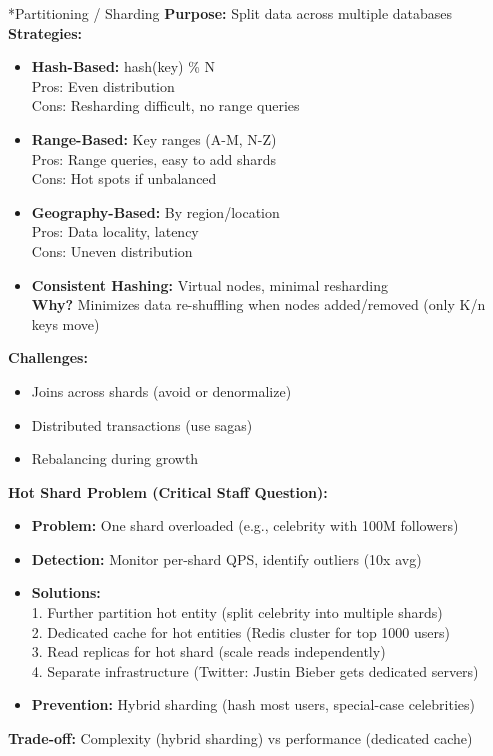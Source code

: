 \documentclass[8pt,landscape]{extarticle}
\makeatletter
\renewcommand{\subsection}{\@startsection{subsection}{2}{0pt}{3pt}{1pt}{\normalfont\normalsize\bfseries}}
\makeatother
\begin{document}
\begin{multicols*}{3}
\subsection*{Partitioning / Sharding}
\textbf{Purpose:} Split data across multiple databases \\
\textbf{Strategies:}
\begin{itemize}
\item \textbf{Hash-Based:} hash(key) \% N
  \\ Pros: Even distribution
  \\ Cons: Resharding difficult, no range queries
\item \textbf{Range-Based:} Key ranges (A-M, N-Z)
  \\ Pros: Range queries, easy to add shards
  \\ Cons: Hot spots if unbalanced
\item \textbf{Geography-Based:} By region/location
  \\ Pros: Data locality, latency
  \\ Cons: Uneven distribution
\item \textbf{Consistent Hashing:} Virtual nodes, minimal resharding
  \\ \textbf{Why?} Minimizes data re-shuffling when nodes added/removed (only K/n keys move)
\end{itemize}
\textbf{Challenges:}
\begin{itemize}
\item Joins across shards (avoid or denormalize)
\item Distributed transactions (use sagas)
\item Rebalancing during growth
\end{itemize}
\textbf{Hot Shard Problem (Critical Staff Question):}
\begin{itemize}
\item \textbf{Problem:} One shard overloaded (e.g., celebrity with 100M followers)
\item \textbf{Detection:} Monitor per-shard QPS, identify outliers (10x avg)
\item \textbf{Solutions:}
  \\ 1. Further partition hot entity (split celebrity into multiple shards)
  \\ 2. Dedicated cache for hot entities (Redis cluster for top 1000 users)
  \\ 3. Read replicas for hot shard (scale reads independently)
  \\ 4. Separate infrastructure (Twitter: Justin Bieber gets dedicated servers)
\item \textbf{Prevention:} Hybrid sharding (hash most users, special-case celebrities)
\end{itemize}
\textbf{Trade-off:} Complexity (hybrid sharding) vs performance (dedicated cache)


\end{multicols*}
\end{document}
